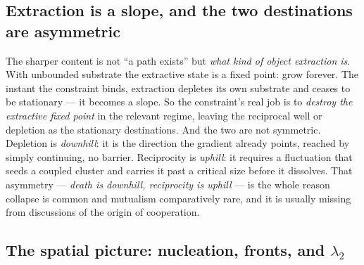 \documentclass[11pt]{article}
\theoremstyle{plain}
\theoremstyle{definition}
\begin{document}
\subsection{Extraction is a slope, and the two destinations are asymmetric}

The sharper content is not ``a path exists'' but \emph{what kind of object extraction is}. With unbounded substrate the extractive state is a fixed point: grow forever. The instant the constraint binds, extraction depletes its own substrate and ceases to be stationary --- it becomes a slope. So the constraint's real job is to \emph{destroy the extractive fixed point} in the relevant regime, leaving the reciprocal well or depletion as the stationary destinations. And the two are not symmetric. Depletion is \emph{downhill}: it is the direction the gradient already points, reached by simply continuing, no barrier. Reciprocity is \emph{uphill}: it requires a fluctuation that seeds a coupled cluster and carries it past a critical size before it dissolves. That asymmetry --- \emph{death is downhill, reciprocity is uphill} --- is the whole reason collapse is common and mutualism comparatively rare, and it is usually missing from discussions of the origin of cooperation.

\subsection{The spatial picture: nucleation, fronts, and $\lambda_2$}
\end{document}
